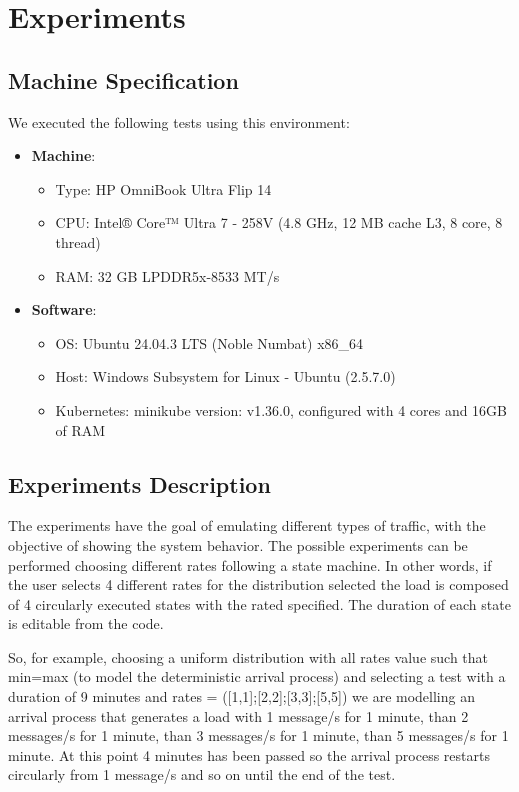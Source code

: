 \section{Experiments}

\subsection{Machine Specification}
We executed the following tests using this environment:


\begin{itemize}
    \item \textbf{Machine}:
    \begin{itemize}
        \item Type: HP OmniBook Ultra Flip 14
        \item CPU: Intel® Core™ Ultra 7 - 258V (4.8 GHz, 12 MB cache L3, 8 core, 8 thread)
        \item RAM: 32 GB LPDDR5x-8533 MT/s
    \end{itemize}
    \item \textbf{Software}:
    \begin{itemize}
        \item OS: Ubuntu 24.04.3 LTS (Noble Numbat) x86\_64
        \item Host: Windows Subsystem for Linux - Ubuntu (2.5.7.0)
        \item Kubernetes: minikube version: v1.36.0, configured with 4 cores and 16GB of RAM
    \end{itemize}
\end{itemize}

\subsection{Experiments Description}
The experiments have the goal of emulating different types of traffic, with the objective of showing the system behavior. The possible experiments can be performed choosing different rates following a state machine. In other words, if the user selects 4 different rates for the distribution selected the load is composed of 4 circularly executed states with the rated specified. The duration of each state is editable from the code.

So, for example, choosing a uniform distribution with all rates value such that min=max (to model the deterministic arrival process) and selecting a test with a duration of 9 minutes and rates = ([1,1];[2,2];[3,3];[5,5]) we are modelling an arrival process that generates a load with 1 message/s for 1 minute, than 2 messages/s for 1 minute, than 3 messages/s for 1 minute, than 5 messages/s for 1 minute. At this point 4 minutes has been passed so the arrival process restarts circularly from 1 message/s and so on until the end of the test.

